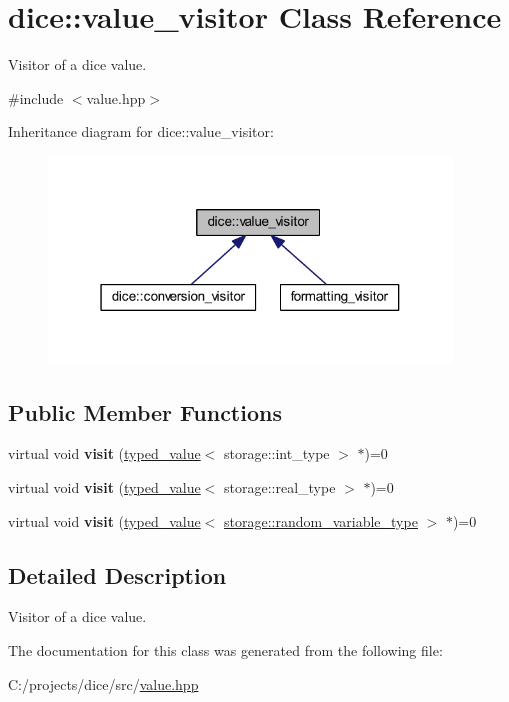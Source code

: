 \hypertarget{classdice_1_1value__visitor}{}\section{dice\+:\+:value\+\_\+visitor Class Reference}
\label{classdice_1_1value__visitor}


Visitor of a dice value.  




{\ttfamily \#include $<$value.\+hpp$>$}



Inheritance diagram for dice\+:\+:value\+\_\+visitor\+:\nopagebreak
\begin{figure}[H]
\begin{center}
\leavevmode
\includegraphics[width=304pt]{classdice_1_1value__visitor__inherit__graph}
\end{center}
\end{figure}
\subsection*{Public Member Functions}
\begin{DoxyCompactItemize}
\item 
\mbox{\label{classdice_1_1value__visitor_a12a8d0f233ffced8b5c8f93327595e48}} 
virtual void {\bfseries visit} (\mbox{\hyperlink{classdice_1_1typed__value}{typed\+\_\+value}}$<$ storage\+::int\+\_\+type $>$ $\ast$)=0
\item 
\mbox{\label{classdice_1_1value__visitor_a5a140a4027d7bdb1a5f539afa2de59e2}} 
virtual void {\bfseries visit} (\mbox{\hyperlink{classdice_1_1typed__value}{typed\+\_\+value}}$<$ storage\+::real\+\_\+type $>$ $\ast$)=0
\item 
\mbox{\label{classdice_1_1value__visitor_a3ab1b89dacad2712686686047622ec1d}} 
virtual void {\bfseries visit} (\mbox{\hyperlink{classdice_1_1typed__value}{typed\+\_\+value}}$<$ \mbox{\hyperlink{classdice_1_1decomposition}{storage\+::random\+\_\+variable\+\_\+type}} $>$ $\ast$)=0
\end{DoxyCompactItemize}


\subsection{Detailed Description}
Visitor of a dice value. 

The documentation for this class was generated from the following file\+:\begin{DoxyCompactItemize}
\item 
C\+:/projects/dice/src/\mbox{\hyperlink{value_8hpp}{value.\+hpp}}\end{DoxyCompactItemize}
